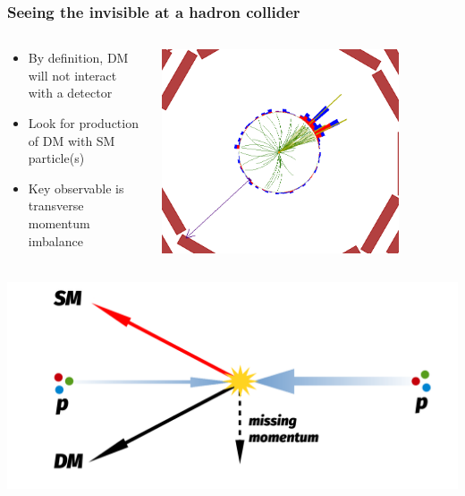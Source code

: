\documentclass[aspectratio=169,xcolor=dvipsnames,,table,compress]{beamer}
\begin{document}
\begin{frame} \frametitle{Seeing the invisible at a hadron collider}
  \vspace{-5mm}
  \begin{columns}[T]
    \begin{column}{0.7\textwidth}
    \begin{itemize}
      \item By definition, DM will not interact with a detector 
      \item Look for production of DM with SM particle(s)
      \item Key observable is transverse momentum imbalance
    \end{itemize}
    \end{column}
    \begin{column}{0.3\textwidth}
      \centering
        \includegraphics[width=0.8\textwidth]{../figures/talk/1275337_634520340_334_RhoPhi.png}
    \end{column}
  \end{columns}
  \begin{columns}
    \begin{column}{0.6\textwidth}
      \vspace{-10mm}
      \includegraphics[width=\textwidth]{../figures/talk/ptmiss3.pdf}

\end{column}
\end{columns}
\end{frame}
\end{document}
